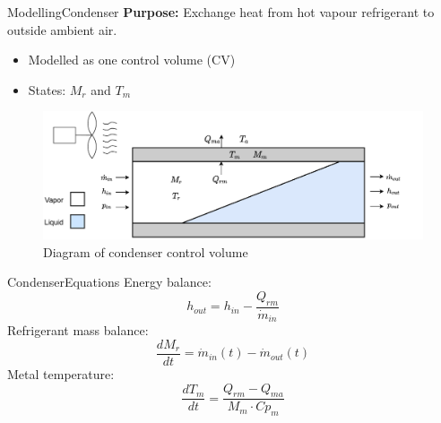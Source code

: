 \begin{frame}{Modelling}{Condenser}
	\textbf{Purpose:} Exchange heat from hot vapour refrigerant to outside ambient air.
	\begin{itemize}
		\item Modelled as one control volume (CV)
		\item States: $M_r$ and $T_m$
	\end{itemize}
	\begin{figure}[h!]
		\centering
		\includegraphics[width=1\textwidth]{../Graphics/Condenser.pdf}
		\caption{Diagram of condenser control volume}
		\label{fig:condenser_CV}
	\end{figure}
\end{frame}
\begin{frame}{Condenser}{Equations}
	Energy balance:
	\begin{equation}
		h_{out} = h_{in} - \frac{Q_{rm}}{\dot{m}_{in}} \label{eq:Condenser_Enthalpy}
	\end{equation}
	Refrigerant mass balance:
	\begin{equation}
		\frac{dM_r}{dt} 	 = \dot{m}_{in}(t) - \dot{m}_{out}(t) \label{eq:Condenser_ChangeOfMass}
	\end{equation}
	Metal temperature:
	\begin{equation}
		\frac{dT_m}{dt} 	 = \frac{Q_{rm} - Q_{ma}}{M_m \cdot Cp_m} \label{eq:Condenser_ChangeOfTemperature}
	\end{equation}
\end{frame}





